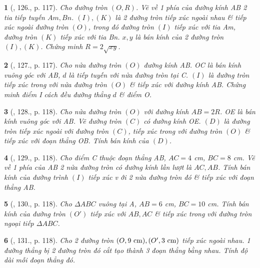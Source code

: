 \documentclass{article}
\newtheorem{baitoan}{}
\begin{document}
\begin{baitoan}[\cite{Binh_Toan_9_tap_1}, 126., p. 117]
	Cho đường tròn $(O,R)$. Vẽ về 1 phía của đường kính AB 2 tia tiếp tuyến $Am,Bn$. $(I),(K)$ là 2 đường tròn tiếp xúc ngoài nhau \& tiếp xúc ngoài đường tròn $(O)$, trong đó đường tròn $(I)$ tiếp xúc với tia Am, đường tròn $(K)$ tiếp xúc với tia Bn. $x,y$ là bán kính của 2 đường tròn $(I),(K)$. Chứng minh $R = 2\sqrt{xy}$.
\end{baitoan}

\begin{baitoan}[\cite{Binh_Toan_9_tap_1}, 127., p. 117]
	Cho nửa đường tròn $(O)$ đường kính AB. OC là bán kính vuông góc với AB, $d$ là tiếp tuyến với nửa đường tròn tại C. $(I)$ là đường tròn tiếp xúc trong với nửa đường tròn $(O)$ \& tiếp xúc với đường kính AB. Chứng minh điểm I cách đều đường thẳng $d$ \& điểm O.
\end{baitoan}

\begin{baitoan}[\cite{Binh_Toan_9_tap_1}, 128., p. 118]
	Cho nửa đường tròn $(O)$ với đường kính $AB = 2R$. OE là bán kính vuông góc với AB. Vẽ đường tròn $(C)$ có đường kính OE. $(D)$ là đường tròn tiếp xúc ngoài với đường tròn $(C)$, tiếp xúc trong với đường tròn $(O)$ \& tiếp xúc với đoạn thẳng OB. Tính bán kính của $(D)$.
\end{baitoan}

\begin{baitoan}[\cite{Binh_Toan_9_tap_1}, 129., p. 118]
	Cho điểm C thuộc đoạn thẳng AB, $AC = 4$ {\rm cm}, $BC = 8$ {\rm cm}. Vẽ về 1 phía của AB 2 nửa đường tròn có đường kính lần lượt là $AC,AB$. Tính bán kính của đường trình $(I)$ tiếp xúc v ới 2 nửa đường tròn đó \& tiếp xúc với đoạn thẳng AB.
\end{baitoan}

\begin{baitoan}[\cite{Binh_Toan_9_tap_1}, 130., p. 118]
	Cho $\Delta ABC$ vuông tại A, $AB = 6$ {\rm cm}, $BC = 10$ {\rm cm}. Tính bán kính của đường tròn $(O')$ tiếp xúc với $AB,AC$ \& tiếp xúc trong với đường tròn ngoại tiếp $\Delta ABC$.
\end{baitoan}

\begin{baitoan}[\cite{Binh_Toan_9_tap_1}, 131., p. 118]
	Cho 2 đường tròn $(O,9\ {\rm cm}),(O',3\ {\rm cm})$ tiếp xúc ngoài nhau. 1 đường thẳng bị 2 đường tròn đó cắt tạo thành 3 đoạn thẳng bằng nhau. Tính độ dài mỗi đoạn thẳng đó.
\end{baitoan}
\end{document}
